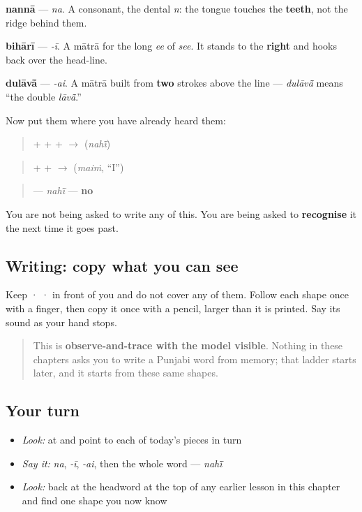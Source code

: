 \textbf{nannā} — \emph{na}. A consonant, the dental \emph{n}: the tongue touches the \textbf{teeth}, not the ridge behind them.

\begin{quote}
\end{quote}

\textbf{bihārī} — \emph{-ī}. A mātrā for the long \emph{ee} of \emph{see}. It stands to the \textbf{right} and hooks back over the head-line.

\begin{quote}
\end{quote}

\textbf{dulāvā̃} — \emph{-ai}. A mātrā built from \textbf{two} strokes above the line — \emph{dulāvā̃} means “the double \emph{lāvā̃}.”

Now put them where you have already heard them:

\begin{quote}
\textbf{} + \textbf{} + \textbf{} + \textbf{} $\to$ \textbf{} (\emph{nahī̃})
\end{quote}

\begin{quote}
\textbf{} + \textbf{} + \textbf{} $\to$ \textbf{} (\emph{maiṁ}, “I”)
\end{quote}

\begin{quote}
\textbf{} — \emph{nahī̃} — \textbf{no}
\end{quote}

You are not being asked to write any of this. You are being asked to \textbf{recognise} it the next time it goes past.

\subsection*{Writing: copy what you can see}
Keep  ·  ·  in front of you and do not cover any of them. Follow each shape once with a finger, then copy it once with a pencil, larger than it is printed. Say its sound as your hand stops.

\begin{quote}
This is \textbf{observe-and-trace with the model visible}. Nothing in these chapters asks you to write a Punjabi word from memory; that ladder starts later, and it starts from these same shapes.
\end{quote}

\subsection*{Your turn}
\begin{itemize}
\raggedright
  \item \emph{Look:} at \textbf{} and point to each of today's pieces in turn
  \item \emph{Say it:} \emph{na}, \emph{-ī}, \emph{-ai}, then the whole word — \emph{nahī̃}
  \item \emph{Look:} back at the headword at the top of any earlier lesson in this chapter and find one shape you now know
\end{itemize}

